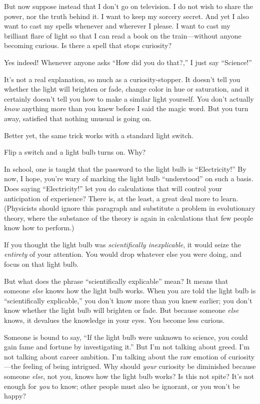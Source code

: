 {
 But now suppose instead that I don't go on
television. I do not wish to share the power, nor the truth behind it.
I want to keep my sorcery secret. And yet I also want to cast my spells
whenever and wherever I please. I want to cast my brilliant flare of
light so that I can read a book on the train---without anyone becoming
curious. Is there a spell that stops curiosity?}

{
 Yes indeed! Whenever anyone asks ``How did you do
that?,'' I just say
``Science!''}

{
 It's not a real explanation, so much as a
curiosity-stopper. It doesn't tell you whether the
light will brighten or fade, change color in hue or saturation, and it
certainly doesn't tell you how to make a similar light
yourself. You don't actually \textit{know} anything
more than you knew before I said the magic word. But you turn away,
satisfied that nothing unusual is going on.}

{
 Better yet, the same trick works with a standard light switch.}

{
 Flip a switch and a light bulb turns on. Why?}

{
 In school, one is taught that the password to the light bulb is
``Electricity!'' By now, I hope,
you're wary of marking the light bulb
``understood'' on such a basis. Does
saying ``Electricity!'' let you do
calculations that will control your anticipation of experience? There
is, at the least, a great deal more to learn. (Physicists should ignore
this paragraph and substitute a problem in evolutionary theory, where
the substance of the theory is again in calculations that few people
know how to perform.)}

{
 If you thought the light bulb was \textit{scientifically
inexplicable}, it would seize the \textit{entirety} of your attention.
You would drop whatever else you were doing, and focus on that light
bulb.}

{
 But what does the phrase ``scientifically
explicable'' mean? It means that someone
\textit{else} knows how the light bulb works. When you are told the
light bulb is ``scientifically
explicable,'' you don't know more
than you knew earlier; you don't know whether the light
bulb will brighten or fade. But because someone \textit{else} knows, it
devalues the knowledge in your eyes. You become less curious.}

{
 Someone is bound to say, ``If the light bulb were
unknown to science, you could gain fame and fortune by investigating
it.'' But I'm not talking about
greed. I'm not talking about career ambition.
I'm talking about the raw emotion of curiosity---the
feeling of being intrigued. Why should \textit{your} curiosity be
diminished because someone \textit{else}, not you, knows how the light
bulb works? Is this not spite? It's not enough for
\textit{you} to know; other people must also be ignorant, or you
won't be happy?}

